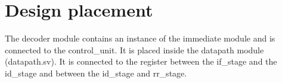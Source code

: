 \section{Design placement}
\label{chapter2}

The decoder module contains an instance of the immediate module and is connected to the control\_unit. It is placed inside the datapath module (datapath.sv).  It is connected to the register between the if\_stage and the id\_stage and between the id\_stage and rr\_stage.



